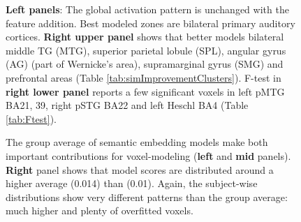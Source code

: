 \begin{figure}
    \centering
    \caption[Encoding with  Features, Group]{\textbf{Left panels}: The global activation pattern is unchanged with the feature addition. Best modeled zones are bilateral primary auditory cortices. \textbf{Right upper panel}  shows that  better models bilateral middle TG (MTG), superior parietal lobule (SPL), angular gyrus (AG) (part of Wernicke's area), supramarginal gyrus (SMG) and prefrontal areas (Table \ref{tab:simImprovementClusters}). F-test in \textbf{right lower panel} reports a few significant voxels in left pMTG BA21, 39, right pSTG BA22 and left Heschl BA4 (Table \ref{tab:Ftest}).} 
    \label{fig:SIM_ContrastMapG}
\end{figure}

\begin{figure}
    \centering
    \caption[Histogram of  with  Features]{The group average of semantic embedding models make both important contributions for voxel-modeling (\textbf{left} and \textbf{mid} panels). \textbf{Right} panel shows that  model scores are distributed around a higher average (0.014) than  (0.01). Again, the subject-wise distributions show very different patterns than the group average: much higher  and plenty of overfitted voxels.} 
    \label{fig:SIM_ASN_Distribution}
\end{figure}


